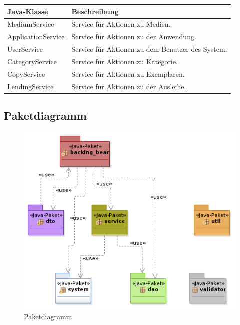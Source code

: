 \documentclass{article}
\begin{document}
        
     \begin{center}
       \begin{table}
        \begin{tabular} { |p{}|p{}| }
             \hline
            Java-Klasse & Beschreibung \\
            \hline\hline
            MediumService &  Service für Aktionen zu Medien. \\
             \hline
            ApplicationService & Service für Aktionen zu der Anwendung. \\
            \hline
            UserService & Service für Aktionen zu dem Benutzer des System. \\
            \hline
            CategoryService & Service für Aktionen zu Kategorie. \\
            \hline
            CopyService& Service für Aktionen zu Exemplaren.\\
             \hline
           LendingService & Service für Aktionen zu der Ausleihe. \\
           \hline
        \end{tabular}
        \end{table}
        \end{center}
        
\subsection{Paketdiagramm}

    \begin{figure}[h!]
        \includegraphics[scale=0.6]{Paketdigram.png}
        \caption{Paketdiagramm}
        \label{fig:Paketdiagramm}
    \end{figure}
\end{document}
